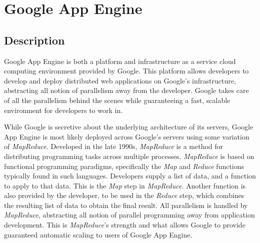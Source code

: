\newcommand{\gae}[0]{Google App Engine}
\newcommand{\mr}[0]{\emph{MapReduce}}
\chapter{Google App Engine}

\section{Description}
\gae{} is both a platform and infrastructure as a service cloud computing environment provided by Google. This platform allows developers to develop and deploy distributed web applications on Google's infrastructure, abstracting all notion of parallelism away from the developer. Google takes care of all the parallelism behind the scenes while guaranteeing a fast, scalable environment for developers to work in.

While Google is secretive about the underlying architecture of its servers, \gae{} is most likely deployed across Google's servers using some variation of \mr{}. Developed in the late 1990s, \mr{} is a method for distributing programming tasks across multiple processes. \mr{} is based on functional programming paradigms, specifically the \emph{Map} and \emph{Reduce} functions typically found in such languages. Developers supply a list of data, and a function to apply to that data. This is the \emph{Map} step in \mr{}. Another function is also provided by the developer, to be used in the \emph{Reduce} step, which combines the resulting list of data to obtain the final result. All parallelism is handled by \mr{}, abstracting all notion of parallel programming away from application development. This is \mr{}'s strength and what allows Google to provide guaranteed automatic scaling to users of \gae{}.~\cite{MapReduce}

%


